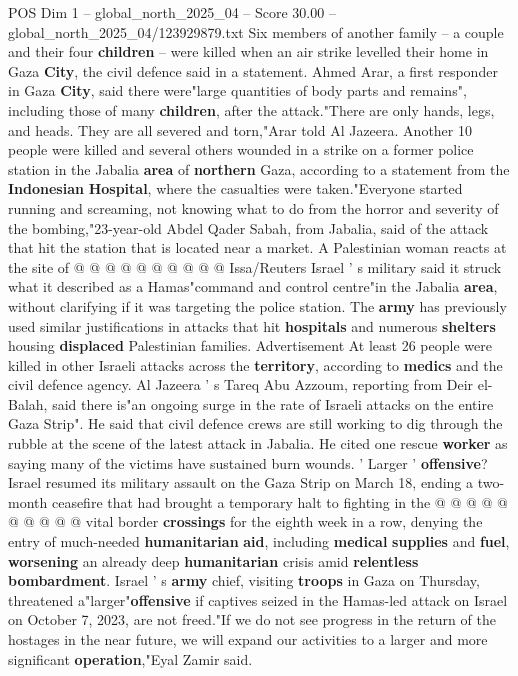 \begin{textsample}{POS Dim 1 – global\_north\_2025\_04 – Score 30.00 – global\_north\_2025\_04/123929879.txt}  \label{ex:f1_pos_346}
Six members of another family -- a couple and their four \textbf{children} -- were killed when an air strike levelled their home in Gaza \textbf{City}, the civil defence said in a statement.
Ahmed Arar, a first responder in Gaza \textbf{City}, said there were"large quantities of body parts and remains", including those of many \textbf{children}, after the attack."There are only hands, legs, and heads.
They are all severed and torn,"Arar told Al Jazeera.
Another 10 people were killed and several others wounded in a strike on a former police station in the Jabalia \textbf{area} of \textbf{northern} Gaza, according to a statement from the \textbf{Indonesian} \textbf{Hospital}, where the casualties were taken."Everyone started running and screaming, not knowing what to do from the horror and severity of the bombing,"23-year-old Abdel Qader Sabah, from Jabalia, said of the attack that hit the station that is located near a market.
A Palestinian woman reacts at the site of @ @ @ @ @ @ @ @ @ @ Issa/Reuters Israel ' s military said it struck what it described as a Hamas"command and control centre"in the Jabalia \textbf{area}, without clarifying if it was targeting the police station.
The \textbf{army} has previously used similar justifications in attacks that hit \textbf{hospitals} and numerous \textbf{shelters} housing \textbf{displaced} Palestinian families.
Advertisement At least 26 people were killed in other Israeli attacks across the \textbf{territory}, according to \textbf{medics} and the civil defence agency.
Al Jazeera ' s Tareq Abu Azzoum, reporting from Deir el-Balah, said there is"an ongoing surge in the rate of Israeli attacks on the entire Gaza Strip".
He said that civil defence crews are still working to dig through the rubble at the scene of the latest attack in Jabalia.
He cited one rescue \textbf{worker} as saying many of the victims have sustained burn wounds. ' Larger ' \textbf{offensive}?
Israel resumed its military assault on the Gaza Strip on March 18, ending a two-month ceasefire that had brought a temporary halt to fighting in the @ @ @ @ @ @ @ @ @ @ vital border \textbf{crossings} for the eighth week in a row, denying the entry of much-needed \textbf{humanitarian} \textbf{aid}, including \textbf{medical} \textbf{supplies} and \textbf{fuel}, \textbf{worsening} an already deep \textbf{humanitarian} crisis amid \textbf{relentless} \textbf{bombardment}.
Israel ' s \textbf{army} chief, visiting \textbf{troops} in Gaza on Thursday, threatened a"larger"\textbf{offensive} if captives seized in the Hamas-led attack on Israel on October 7, 2023, are not freed."If we do not see progress in the return of the hostages in the near future, we will expand our activities to a larger and more significant \textbf{operation},"Eyal Zamir said.

\end{textsample}
